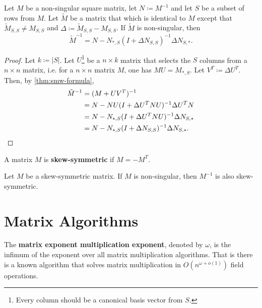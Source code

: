 \begin{corollary}
    \label{cor:update_cor} 
    Let \(M\) be a non-singular square matrix, let \(N \coloneqq M^{-1}\) and let \(S\) be a subset of rows from \(M\).
    Let \(\tilde{M}\) be a matrix that which is identical to \(M\) except that \(\tilde{M}_{S, S} \neq M_{S, S}\)
    and \(\Delta \coloneqq \tilde{M}_{S, S} - M_{S, S}\).
    If \(\tilde{M}\) is non-singular, then
    \[
        \tilde{M}^{-1} = N - N_{*, S}(I + \Delta N_{S, S})^{-1}\Delta N_{S, *}.
    \]
\end{corollary}

\begin{proof}
    Let \(k \coloneqq |S|\). 
    Let \(U\)\footnote{Every column should be a canonical basis vector from \(S\).} be a \(n \times k\) matrix that selects the \(S\) columns from a \(n \times n\) matrix, i.e.
    for a \(n \times n\) matrix \(M\), one has \(MU = M_{*, S}\). Let \(V^T \coloneqq \Delta U^T\). 
    Then, by \cref{thm:smw-formula}, 
    \begin{align*}
        \tilde{M}^{-1} &= (M + U V^T)^{-1} \\
        &= N - N U (I + \Delta U^T N U)^{-1} \Delta U^T N \\
        &= N - N_{*, S} (I + \Delta U^T N U)^{-1} \Delta N_{S, *} \\
        &= N - N_{*, S} (I + \Delta N_{S, S})^{-1} \Delta N_{S, *}. \qedhere
    \end{align*}
\end{proof}

\begin{definition}
\label{def:skew}
    A matrix \(M\) is \textbf{skew-symmetric} if \(M = -M^{T}\).
\end{definition}

\begin{fact}
    Let \(M\) be a skew-symmetric matrix.
    If \(M\) is non-singular, then \(M^{-1}\) is also skew-symmetric.
\end{fact}

\section{Matrix Algorithms}
\label{matrix:time_complexity}


\begin{definition}
  The \textbf{matrix exponent multiplication exponent}, denoted by \(\omega\), is the infimum of the exponent over all matrix multiplication algorithms.
  That is there is a known algorithm that solves matrix multiplication in \(O(n^{\omega + o(1)})\) field operations.
\end{definition}

